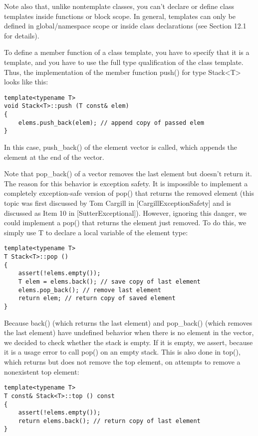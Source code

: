 Note also that, unlike nontemplate classes, you can’t declare or define class templates inside functions or block scope. In general, templates can only be defined in global/namespace scope or inside class declarations (see Section 12.1 for details).


To define a member function of a class template, you have to specify that it is a template, and you have to use the full type qualification of the class template. Thus, the implementation of the member function push() for type Stack<T> looks like this:

\begin{lstlisting}[style=styleCXX]
template<typename T>
void Stack<T>::push (T const& elem)
{
	elems.push_back(elem); // append copy of passed elem
}
\end{lstlisting}

In this case, push\_back() of the element vector is called, which appends the element at the end of the vector.

Note that pop\_back() of a vector removes the last element but doesn’t return it. The reason for this behavior is exception safety. It is impossible to implement a completely exception-safe version of pop() that returns the removed element (this topic was first discussed by Tom Cargill in [CargillExceptionSafety] and is discussed as Item 10 in [SutterExceptional]). However, ignoring this danger, we could implement a pop() that returns the element just removed. To do this, we simply use T to declare a local variable of the element type:

\begin{lstlisting}[style=styleCXX]
template<typename T>
T Stack<T>::pop ()
{
	assert(!elems.empty());
	T elem = elems.back(); // save copy of last element
	elems.pop_back(); // remove last element
	return elem; // return copy of saved element
}
\end{lstlisting}

Because back() (which returns the last element) and pop\_back() (which removes the last element) have undefined behavior when there is no element in the vector, we decided to check whether the stack is empty. If it is empty, we assert, because it is a usage error to call pop() on an empty stack. This is also done in top(), which returns but does not remove the top element, on attempts to remove a nonexistent top element:

\begin{lstlisting}[style=styleCXX]
template<typename T>
T const& Stack<T>::top () const
{
	assert(!elems.empty());
	return elems.back(); // return copy of last element
}
\end{lstlisting}

